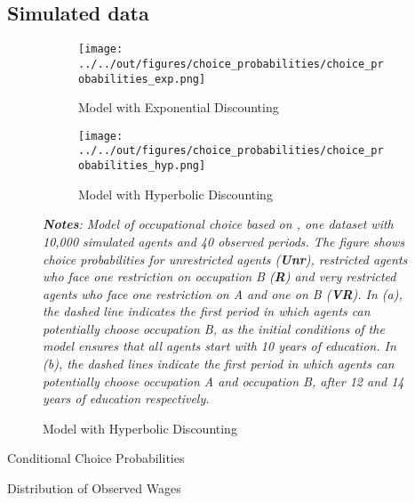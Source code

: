\subsection{Simulated data}
\label{simulated-data}

\begin{figure}
\centering
\caption{Choice Probabilities} \label{fig:choice-probabilities}

\begin{subfigure}{\textwidth} 
\caption{Model with Exponential Discounting}
\label{fig:choice-exp}
\texttt{[image: ../../out/figures/choice\_probabilities/choice\_probabilities\_exp.png]}
\end{subfigure}

\medskip

\begin{subfigure}{\textwidth}
\caption{Model with Hyperbolic Discounting}
\label{fig:choice-hyp}

\texttt{[image: ../../out/figures/choice\_probabilities/choice\_probabilities\_hyp.png]}
\end{subfigure}

\bigskip
\footnotesize
\justify
\textit{\textbf{Notes}: Model of occupational choice based on \textcite{KeaneWolpin1994}, one dataset with 10,000 simulated agents and 40 observed periods. The figure shows choice probabilities for unrestricted agents (\textbf{Unr}), restricted agents who face one restriction on occupation B (\textbf{R}) and very restricted agents who face one restriction on A and one on B (\textbf{VR}). In (a), the dashed line indicates the first period in which agents can potentially choose occupation B, as the initial conditions of the model ensures that all agents start with 10 years of education. In (b), the dashed lines indicate the first period in which agents can potentially choose occupation A and occupation B, after 12 and 14 years of education respectively.}
\end{figure}

\begin{table}
\centering
\caption{Conditional Choice Probabilities} \label{tab:choice-probabilities}
\begin{adjustbox}{max width=\textwidth}

\end{adjustbox}
\bigskip
\caption{Distribution of Observed Wages} \label{tab:wages}
\begin{adjustbox}{max width=\textwidth}

\end{adjustbox}
\end{table}

